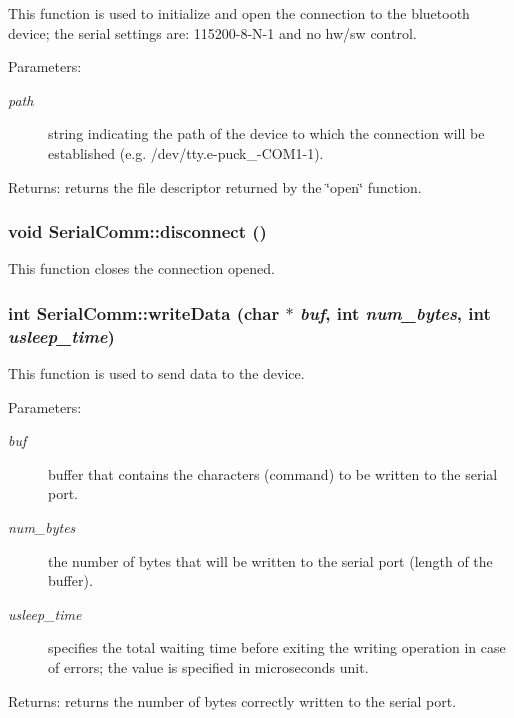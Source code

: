 This function is used to initialize and open the connection to the bluetooth device; the serial settings are: 115200-8-N-1 and no hw/sw control. \begin{Desc}
\item[Parameters:]
\begin{description}
\item[{\em path}]string indicating the path of the device to which the connection will be established (e.g. /dev/tty.e-puck\_-COM1-1). \end{description}
\end{Desc}
\begin{Desc}
\item[Returns:]returns the file descriptor returned by the \char`\"{}open\char`\"{} function. \end{Desc}
\subsubsection[disconnect]{\setlength{\rightskip}{0pt plus 5cm}void SerialComm::disconnect ()}\label{class_serial_comm_c23973b8ccccfca062a59cfecdd15497}


This function closes the connection opened. 
\subsubsection[writeData]{\setlength{\rightskip}{0pt plus 5cm}int SerialComm::writeData (char $\ast$ {\em buf}, \/  int {\em num\_\-bytes}, \/  int {\em usleep\_\-time})}\label{class_serial_comm_15f3872a4a2759ecaab6d13876df95c3}


This function is used to send data to the device. \begin{Desc}
\item[Parameters:]
\begin{description}
\item[{\em buf}]buffer that contains the characters (command) to be written to the serial port. \item[{\em num\_\-bytes}]the number of bytes that will be written to the serial port (length of the buffer). \item[{\em usleep\_\-time}]specifies the total waiting time before exiting the writing operation in case of errors; the value is specified in microseconds unit. \end{description}
\end{Desc}
\begin{Desc}
\item[Returns:]returns the number of bytes correctly written to the serial port. \end{Desc}
